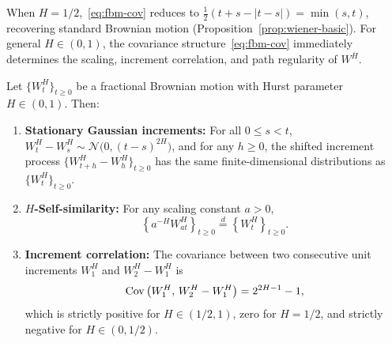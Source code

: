When $H = 1/2$,~\eqref{eq:fbm-cov} reduces to $\frac{1}{2}(t + s - |t - s|) = \min(s, t)$, recovering standard Brownian motion (Proposition~\ref{prop:wiener-basic}). For general $H \in (0, 1)$, the covariance structure~\eqref{eq:fbm-cov} immediately determines the scaling, increment correlation, and path regularity of $W^H$.

\begin{proposition}
\label{prop:fbm-properties}
Let $\{W_t^H\}_{t \ge 0}$ be a fractional Brownian motion with Hurst parameter $H \in (0, 1)$. Then:
\begin{enumerate}
    \item \textbf{Stationary Gaussian increments:} For all $0 \le s < t$, $W_t^H - W_s^H \sim \mathcal{N}\big(0, (t - s)^{2H}\big)$, and for any $h \ge 0$, the shifted increment process $\{W_{t+h}^H - W_h^H\}_{t \ge 0}$ has the same finite-dimensional distributions as $\{W_t^H\}_{t \ge 0}$.
    \item \textbf{$H$-Self-similarity:} For any scaling constant $a > 0$,
    \[
    \left\{a^{-H} W_{at}^H\right\}_{t \ge 0} \stackrel{d}{=} \left\{W_t^H\right\}_{t \ge 0}.
    \]
    \item \textbf{Increment correlation:} The covariance between two consecutive unit increments $W_1^H$ and $W_2^H - W_1^H$ is
    \begin{equation}
    \label{eq:fbm-increment-corr}
    \operatorname{Cov}\big(W_1^H,\, W_2^H - W_1^H\big) = 2^{2H - 1} - 1,
    \end{equation}
    which is strictly positive for $H \in (1/2, 1)$, zero for $H = 1/2$, and strictly negative for $H \in (0, 1/2)$.
\end{enumerate}
\end{proposition}

